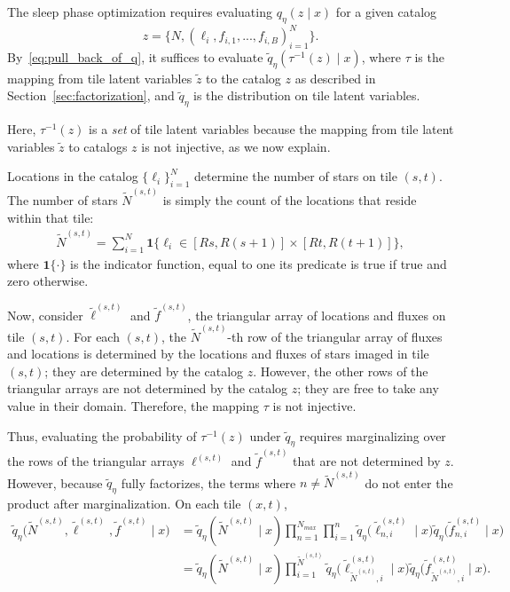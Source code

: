The sleep phase optimization requires evaluating
$q_\eta(z \mid x)$ for a given catalog
\[z = \{N, (\ell_i, f_{i,1}, ..., f_{i,B})_{i = 1}^N\}.\]
By~\eqref{eq:pull_back_of_q}, 
it suffices to evaluate $\tilde q_\eta(\tau^{-1}(z) \mid x)$, 
where $\tau$ is the mapping from tile latent variables $\tilde z$ to the catalog $z$ as described in Section~\ref{sec:factorization}, 
and $\tilde q_\eta$ is the distribution on tile latent variables. 

Here, $\tau^{-1}(z)$ is a {\itshape set} of tile latent variables because the mapping from tile latent variables $\tilde z$ to catalogs $z$ is not injective, as we now explain.  

Locations in the catalog $\{\ell_i\}_{i=1}^N$
determine the number of stars on tile $(s,t)$. 
The number of stars $\tilde N^{(s,t)}$ is simply the count of the locations that reside within that tile:
\begin{align}
\tilde N^{(s,t)} = \sum_{i=1}^N 
\mathbf 1 \Big\{\ell_i\in [Rs, R(s+1)] \times [Rt, R(t+1)]\Big\},
\end{align}
where $\mathbf{1}\{\cdot\}$ is the indicator function, equal to one its predicate is true if true and zero otherwise.

Now, consider $\tilde\ell^{(s, t)}$ and $\tilde f^{(s, t)}$, the triangular array of locations and fluxes on tile $(s,t)$. 
For each $(s,t)$, the $\tilde N^{(s,t)}$-th row 
of the triangular array of fluxes and locations is
determined by the locations and fluxes of stars imaged in tile $(s,t)$; they are determined by the catalog $z$. However, the other rows 
of the triangular arrays are not determined by 
the catalog $z$; they are free to take any value in their domain. Therefore, the mapping $\tau$ is not injective. 

Thus, evaluating the probability of $\tau^{-1}(z)$ under $\tilde q_\eta$ requires marginalizing over the rows of the triangular arrays $\ell^{(s, t)}$ and $\tilde f^{(s, t)}$ that are not determined by $z$. However, 
because $\tilde q_\eta$ fully factorizes, the terms 
where $n \not= \tilde N^{(s,t)}$ do not enter the
product
after marginalization.
On each tile $(x,t)$,
\begin{align}
    \tilde q_\eta\big(\tilde N^{(s, t)}, \tilde \ell^{(s, t)}, \tilde f^{(s, t)} \mid x\big) &= 
    \tilde q_\eta(\tilde N^{(s,t)} \mid x) 
    \prod_{n = 1}^{N_{max}}\prod_{i = 1}^{n}
    \tilde q_\eta\big(\tilde \ell_{n,i}^{(s, t)} \mid x\big)
    \tilde q_\eta\big(\tilde f_{n,i}^{(s, t)} \mid x\big) \\
    &= \tilde q_\eta(\tilde N^{(s,t)} \mid x) 
    \prod_{i = 1}^{\tilde N^{(s,t)}}
    \tilde q_\eta\big(\tilde \ell_{\tilde N^{(s,t)},i}^{(s, t)} \mid x\big)
    \tilde q_\eta\big(\tilde f_{\tilde N^{(s,t)},i}^{(s, t)} \mid x\big).
\end{align}

